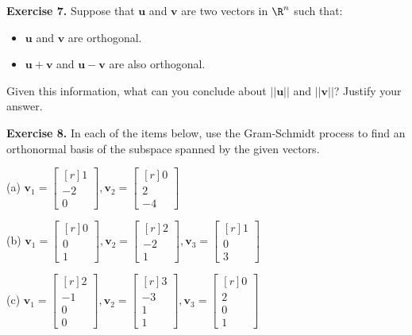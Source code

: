 \documentclass[12pt]{article}
\begin{document}
\bigskip
\textbf{Exercise 7.} Suppose that $\mathbf{u}$ and $\mathbf{v}$ are two vectors in $\R^n$ such that:
\begin{itemize}
\item $\mathbf{u}$ and $\mathbf{v}$ are orthogonal.
\item $\mathbf{u}+\mathbf{v}$ and $\mathbf{u}-\mathbf{v}$ are also orthogonal.
\end{itemize}
Given this information, what can you conclude about $||\mathbf{u}||$ and $||\mathbf{v}||$? Justify your answer.

\bigskip
\textbf{Exercise 8.} In each of the items below, use the Gram-Schmidt process to find an orthonormal basis of the subspace spanned by the given vectors.

\medskip
(a)
$
\mathbf{v}_1=\begin{bmatrix*}[r]1\\-2\\0\end{bmatrix*}, 
\mathbf{v}_2=\begin{bmatrix*}[r]0\\2\\-4\end{bmatrix*} 
$

\medskip
(b)
$
\mathbf{v}_1=\begin{bmatrix*}[r]0\\0\\1\end{bmatrix*}, 
\mathbf{v}_2=\begin{bmatrix*}[r]2\\-2\\1\end{bmatrix*}, 
\mathbf{v}_3=\begin{bmatrix*}[r]1\\0\\3\end{bmatrix*}
$


\medskip
(c)
$
\mathbf{v}_1=\begin{bmatrix*}[r]2\\-1\\0\\0\end{bmatrix*}, 
\mathbf{v}_2=\begin{bmatrix*}[r]3\\-3\\1\\1\end{bmatrix*}, 
\mathbf{v}_3=\begin{bmatrix*}[r]0\\2\\0\\1\end{bmatrix*}
$
\end{document}
